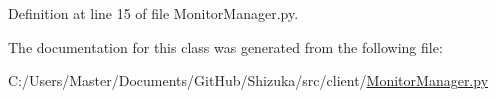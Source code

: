 Definition at line 15 of file Monitor\-Manager.\-py.



The documentation for this class was generated from the following file\-:\begin{DoxyCompactItemize}
\item 
C\-:/\-Users/\-Master/\-Documents/\-Git\-Hub/\-Shizuka/src/client/\hyperlink{_monitor_manager_8py}{Monitor\-Manager.\-py}\end{DoxyCompactItemize}
